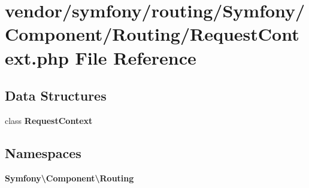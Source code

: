 \section{vendor/symfony/routing/\+Symfony/\+Component/\+Routing/\+Request\+Context.php File Reference}
\label{_request_context_8php}
\subsection*{Data Structures}
\begin{DoxyCompactItemize}
\item 
class {\bf Request\+Context}
\end{DoxyCompactItemize}
\subsection*{Namespaces}
\begin{DoxyCompactItemize}
\item 
 {\bf Symfony\textbackslash{}\+Component\textbackslash{}\+Routing}
\end{DoxyCompactItemize}
